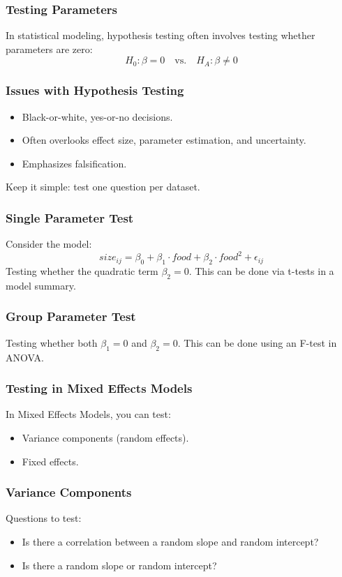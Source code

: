 \documentclass{beamer}
\begin{document}
\begin{frame}
    \frametitle{Testing Parameters}
    In statistical modeling, hypothesis testing often involves testing whether parameters are zero:
    \[
    H_0: \beta = 0 \quad \text{vs.} \quad H_A: \beta \neq 0
    \]
\end{frame}

\begin{frame}
    \frametitle{Issues with Hypothesis Testing}
    \begin{itemize}
        \item Black-or-white, yes-or-no decisions.
        \item Often overlooks effect size, parameter estimation, and uncertainty.
        \item Emphasizes falsification.
    \end{itemize}
    Keep it simple: test one question per dataset.
\end{frame}

\begin{frame}
    \frametitle{Single Parameter Test}
    Consider the model:
    \[
    size_{ij} = \beta_0 + \beta_1 \cdot food + \beta_2 \cdot food^2 + \epsilon_{ij}
    \]
    Testing whether the quadratic term $\beta_2 = 0$. This can be done via t-tests in a model summary.
\end{frame}

\begin{frame}
    \frametitle{Group Parameter Test}
    Testing whether both $\beta_1 = 0$ and $\beta_2 = 0$. This can be done using an F-test in ANOVA.
\end{frame}

\begin{frame}
    \frametitle{Testing in Mixed Effects Models}
    In Mixed Effects Models, you can test:
    \begin{itemize}
        \item Variance components (random effects).
        \item Fixed effects.
    \end{itemize}
\end{frame}

\begin{frame}
    \frametitle{Variance Components}
    Questions to test:
    \begin{itemize}
        \item Is there a correlation between a random slope and random intercept?
        \item Is there a random slope or random intercept?
    \end{itemize}
\end{frame}
\end{document}
